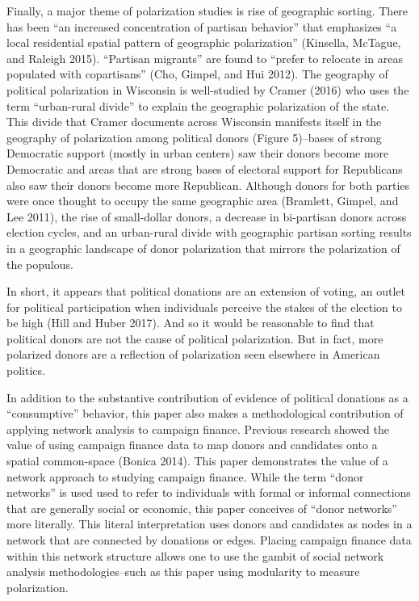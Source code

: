 \documentclass[12pt,]{article}
\begin{document}
Finally, a major theme of polarization studies is rise of geographic
sorting. There has been ``an increased concentration of partisan
behavior'' that emphasizes ``a local residential spatial pattern of
geographic polarization'' (Kinsella, McTague, and Raleigh 2015).
``Partisan migrants'' are found to ``prefer to relocate in areas
populated with copartisans'' (Cho, Gimpel, and Hui 2012). The geography
of political polarization in Wisconsin is well-studied by Cramer (2016)
who uses the term ``urban-rural divide'' to explain the geographic
polarization of the state. This divide that Cramer documents across
Wisconsin manifests itself in the geography of polarization among
political donors (Figure 5)--bases of strong Democratic support (mostly
in urban centers) saw their donors become more Democratic and areas that
are strong bases of electoral support for Republicans also saw their
donors become more Republican. Although donors for both parties were
once thought to occupy the same geographic area (Bramlett, Gimpel, and
Lee 2011), the rise of small-dollar donors, a decrease in bi-partisan
donors across election cycles, and an urban-rural divide with geographic
partisan sorting results in a geographic landscape of donor polarization
that mirrors the polarization of the populous.

In short, it appears that political donations are an extension of
voting, an outlet for political participation when individuals perceive
the stakes of the election to be high (Hill and Huber 2017). And so it
would be reasonable to find that political donors are not the cause of
political polarization. But in fact, more polarized donors are a
reflection of polarization seen elsewhere in American politics.

In addition to the substantive contribution of evidence of political
donations as a ``consumptive'' behavior, this paper also makes a
methodological contribution of applying network analysis to campaign
finance. Previous research showed the value of using campaign finance
data to map donors and candidates onto a spatial common-space (Bonica
2014). This paper demonstrates the value of a network approach to
studying campaign finance. While the term ``donor networks'' is used
used to refer to individuals with formal or informal connections that
are generally social or economic, this paper conceives of ``donor
networks'' more literally. This literal interpretation uses donors and
candidates as nodes in a network that are connected by donations or
edges. Placing campaign finance data within this network structure
allows one to use the gambit of social network analysis
methodologies--such as this paper using modularity to measure
polarization.
\end{document}
